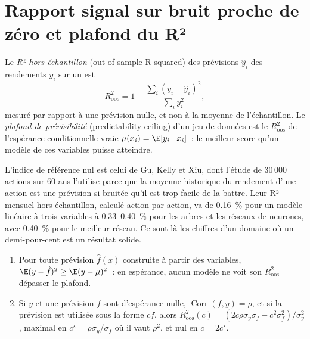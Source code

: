 \section{Rapport signal sur bruit proche de zéro et plafond du R²}

\begin{definition}\label{def:ml:why-financial-machine-learning-is-different:r2}
Le \emph{R² hors échantillon} (out-of-sample R-squared) des prévisions $\hat y_i$ des rendements $y_i$ sur un
 est
\[
R^2_{\mathrm{oos}} = 1 - \frac{\sum_i(y_i - \hat y_i)^2}{\sum_i y_i^2},
\]
mesuré par rapport à une prévision nulle, et non à la moyenne de l'échantillon. Le \emph{plafond de prévisibilité} (predictability ceiling)
d'un jeu de données est le $R^2_{\mathrm{oos}}$ de l'espérance conditionnelle vraie $\mu(x_i) = \E[y_i\mid x_i]$~: le meilleur score
qu'un modèle de ces variables puisse atteindre.
\end{definition}

L'indice de référence nul est celui de Gu, Kelly et Xiu, dont l'étude de 30\,000 actions sur 60 ans l'utilise parce que la moyenne historique
du rendement d'une action est une prévision si bruitée qu'il est trop facile de la battre. Leur R² mensuel hors échantillon, calculé action par action,
va de 0.16~\% pour un modèle linéaire à trois variables à 0.33--0.40~\% pour les arbres et les réseaux de neurones, avec
0.40~\% pour le meilleur réseau. Ce sont là les chiffres d'un domaine où un demi-pour-cent est un résultat solide.

\begin{proposition}\label{prop:ml:why:ceiling}
\begin{enumerate}
\item Pour toute prévision $\hat f(x)$ construite à partir des variables, $\E(y - \hat f)^2 \ge \E(y - \mu)^2$~: en espérance, aucun
modèle ne voit son $R^2_{\mathrm{oos}}$ dépasser le plafond.
\item Si $y$ et une prévision $f$ sont d'espérance nulle, $\operatorname{Corr}(f, y) = \rho$, et si la prévision est utilisée sous la forme $c f$, alors
$R^2_{\mathrm{oos}}(c) = (2c\rho\sigma_y\sigma_f - c^2\sigma_f^2)/\sigma_y^2$, maximal en $c^\star = \rho\sigma_y/\sigma_f$
où il vaut $\rho^2$, et nul en $c = 2c^\star$.
\end{enumerate}
\end{proposition}


